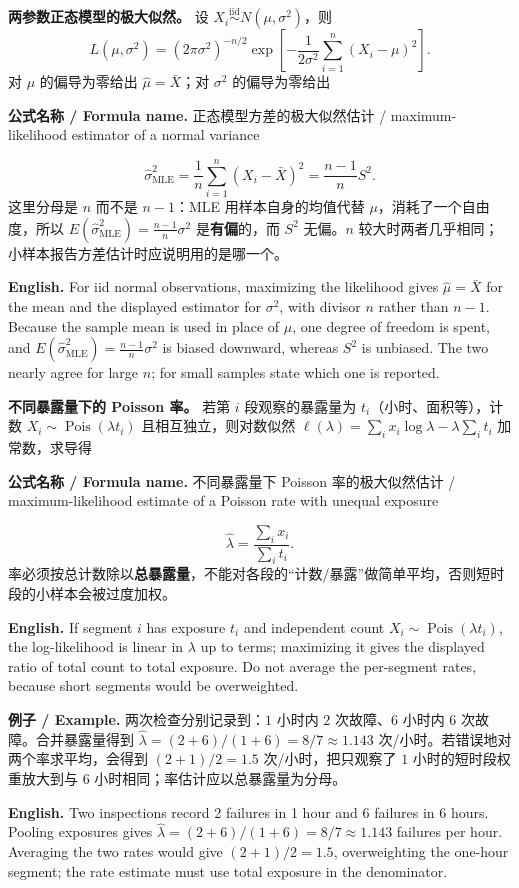 \documentclass[UTF8,11pt,a4paper]{ctexart}
\newcommand{\EN}[1]{\par\noindent\textbf{English.} #1\par}
\newcommand{\FORMULA}[2]{\par\noindent\textbf{公式名称 / Formula name.} #1 / #2\par}
\newcommand{\EX}[2]{\par\noindent\textbf{例子 / Example.} #1\par\EN{#2}}
\begin{document}
\noindent\textbf{两参数正态模型的极大似然。} 设 $X_i\overset{\mathrm{iid}}\sim N(\mu,\sigma^2)$，则
\[
L(\mu,\sigma^2)=(2\pi\sigma^2)^{-n/2}\exp\!\left[-\frac{1}{2\sigma^2}\sum_{i=1}^n(X_i-\mu)^2\right].
\]
对 $\mu$ 的偏导为零给出 $\widehat\mu=\bar X$；对 $\sigma^2$ 的偏导为零给出
\FORMULA{正态模型方差的极大似然估计}{maximum-likelihood estimator of a normal variance}
\[
\widehat\sigma^2_{\mathrm{MLE}}=\frac1n\sum_{i=1}^n(X_i-\bar X)^2
=\frac{n-1}{n}S^2.
\]
这里分母是 $n$ 而不是 $n-1$：MLE 用样本自身的均值代替 $\mu$，消耗了一个自由度，所以 $E(\widehat\sigma^2_{\mathrm{MLE}})=\frac{n-1}{n}\sigma^2$ 是\textbf{有偏}的，而 $S^2$ 无偏。$n$ 较大时两者几乎相同；小样本报告方差估计时应说明用的是哪一个。
\EN{For iid normal observations, maximizing the likelihood gives $\widehat\mu=\bar X$ for the mean and the displayed estimator for $\sigma^2$, with divisor $n$ rather than $n-1$. Because the sample mean is used in place of $\mu$, one degree of freedom is spent, and $E(\widehat\sigma^2_{\mathrm{MLE}})=\frac{n-1}{n}\sigma^2$ is biased downward, whereas $S^2$ is unbiased. The two nearly agree for large $n$; for small samples state which one is reported.}

\noindent\textbf{不同暴露量下的 Poisson 率。} 若第 $i$ 段观察的暴露量为 $t_i$（小时、面积等），计数 $X_i\sim\operatorname{Pois}(\lambda t_i)$ 且相互独立，则对数似然 $\ell(\lambda)=\sum_i x_i\log\lambda-\lambda\sum_i t_i$ 加常数，求导得
\FORMULA{不同暴露量下 Poisson 率的极大似然估计}{maximum-likelihood estimate of a Poisson rate with unequal exposure}
\[
\widehat\lambda=\frac{\sum_i x_i}{\sum_i t_i}.
\]
率必须按总计数除以\textbf{总暴露量}，不能对各段的“计数/暴露”做简单平均，否则短时段的小样本会被过度加权。
\EN{If segment $i$ has exposure $t_i$ and independent count $X_i\sim\operatorname{Pois}(\lambda t_i)$, the log-likelihood is linear in $\lambda$ up to terms; maximizing it gives the displayed ratio of total count to total exposure. Do not average the per-segment rates, because short segments would be overweighted.}

\EX{两次检查分别记录到：$1$ 小时内 $2$ 次故障、$6$ 小时内 $6$ 次故障。合并暴露量得到 $\widehat\lambda=(2+6)/(1+6)=8/7\approx1.143$ 次/小时。若错误地对两个率求平均，会得到 $(2+1)/2=1.5$ 次/小时，把只观察了 $1$ 小时的短时段权重放大到与 $6$ 小时相同；率估计应以总暴露量为分母。}{Two inspections record 2 failures in 1 hour and 6 failures in 6 hours. Pooling exposures gives $\widehat\lambda=(2+6)/(1+6)=8/7\approx1.143$ failures per hour. Averaging the two rates would give $(2+1)/2=1.5$, overweighting the one-hour segment; the rate estimate must use total exposure in the denominator.}
\end{document}
